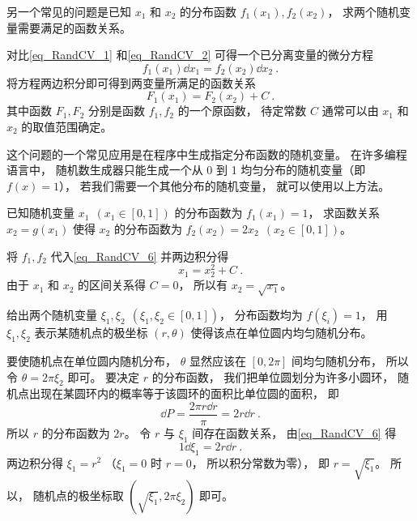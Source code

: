 另一个常见的问题是已知 $x_1$ 和 $x_2$ 的分布函数 $f_1(x_1), f_2(x_2)$， 求两个随机变量需要满足的函数关系。

对比\autoref{eq_RandCV_1} 和\autoref{eq_RandCV_2} 可得一个已分离变量的微分方程
\begin{equation}\label{eq_RandCV_6}
f_1(x_1)\dd{x_1} = f_2(x_2)\dd{x_2}~.
\end{equation}
将方程两边积分即可得到两变量所满足的函数关系
\begin{equation}
F_1(x_1) = F_2(x_2) + C~.
\end{equation}
其中函数 $F_1, F_2$ 分别是函数 $f_1, f_2$ 的一个原函数， 待定常数 $C$ 通常可以由 $x_1$ 和 $x_2$ 的取值范围确定。

这个问题的一个常见应用是在程序中生成指定分布函数的随机变量。 在许多编程语言中， 随机数生成器只能生成一个从 0 到 1 均匀分布的随机变量（即 $f(x) = 1$）， 若我们需要一个其他分布的随机变量， 就可以使用以上方法。

\begin{example}{}
已知随机变量 $x_1\ \ (x_1\in [0,1])$ 的分布函数为 $f_1(x_1) = 1$， 求函数关系 $x_2 = g(x_1)$ 使得 $x_2$ 的分布函数为 $f_2(x_2) = 2x_2\ \ (x_2\in [0,1])$。

将 $f_1, f_2$ 代入\autoref{eq_RandCV_6} 并两边积分得
\begin{equation}
x_1 = x_2^2 + C~.
\end{equation}
由于 $x_1$ 和 $x_2$ 的区间关系得 $C = 0$， 所以有 $x_2 = \sqrt{x_1}$。
\end{example}

\begin{example}{}\label{ex_RandCV_3}
给出两个随机变量 $\xi_1, \xi_2\ \ (\xi_1, \xi_2\in [0,1])$， 分布函数均为 $f(\xi_i) = 1$， 用 $\xi_1, \xi_2$ 表示某随机点的极坐标 $(r,\theta)$ 使得该点在单位圆内均匀随机分布。

要使随机点在单位圆内随机分布， $\theta$ 显然应该在 $[0,2\pi]$ 间均匀随机分布， 所以令 $\theta = 2\pi\xi_2$ 即可。 要决定 $r$ 的分布函数， 我们把单位圆划分为许多小圆环， 随机点出现在某圆环内的概率等于该圆环的面积比单位圆的面积， 即
\begin{equation}
\dd{P} = \frac{2\pi r\dd{r}}{\pi} = 2r\dd{r}~.
\end{equation}
所以 $r$ 的分布函数为 $2r$。 令 $r$ 与 $\xi_1$ 间存在函数关系， 由\autoref{eq_RandCV_6} 得
\begin{equation}
1\dd{\xi_1} = 2r\dd{r}~.
\end{equation}
两边积分得 $\xi_1 = r^2$ （$\xi_1 = 0$ 时 $r = 0$， 所以积分常数为零）， 即 $r = \sqrt{\xi_1}$。 所以， 随机点的极坐标取 $(\sqrt{\xi_1}, 2\pi \xi_2)$ 即可。
\end{example}

